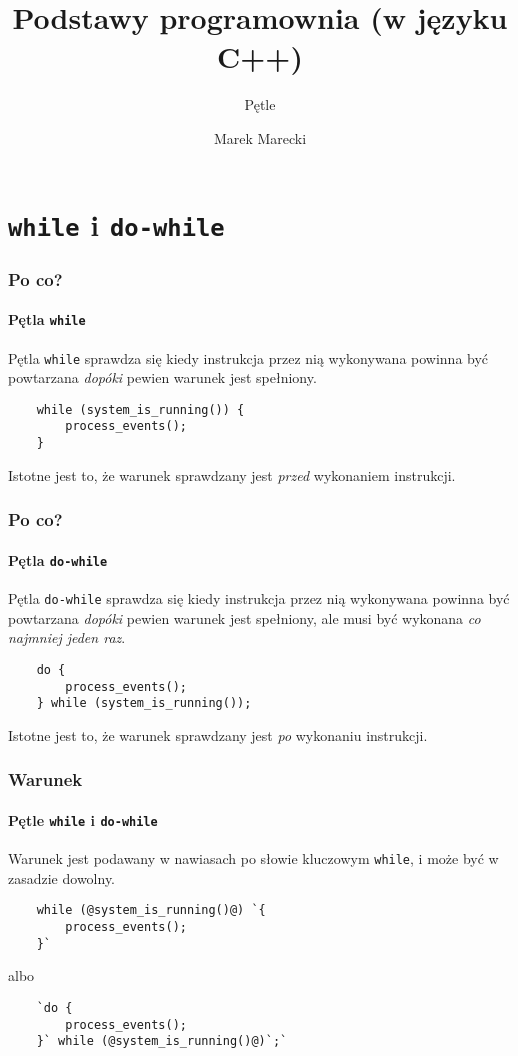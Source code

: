 \documentclass[aspectratio=169]{beamer}
\title{Podstawy programownia (w języku C++)}
\subtitle{Pętle}
\author{Marek Marecki}
\institute{Polsko-Japońska Akademia Technik Komputerowych}
\begin{document}
{%
    \frame{\titlepage}
}

\section{{\tt while} i {\tt do-while}}

\begin{frame}[fragile]
    \frametitle{Po co?}
    \framesubtitle{Pętla {\tt while}}

    Pętla {\tt while} sprawdza się kiedy instrukcja przez nią wykonywana powinna
    być powtarzana \emph{dopóki} pewien warunek jest spełniony.

    \begin{lstlisting}
    while (system_is_running()) {
        process_events();
    }
    \end{lstlisting}

    Istotne jest to, że warunek sprawdzany jest \emph{przed} wykonaniem
    instrukcji.
\end{frame}

\begin{frame}[fragile]
    \frametitle{Po co?}
    \framesubtitle{Pętla {\tt do-while}}

    Pętla {\tt do-while} sprawdza się kiedy instrukcja przez nią wykonywana powinna
    być powtarzana \emph{dopóki} pewien warunek jest spełniony, ale musi być
    wykonana \emph{co najmniej jeden raz}.

    \begin{lstlisting}
    do {
        process_events();
    } while (system_is_running());
    \end{lstlisting}

    Istotne jest to, że warunek sprawdzany jest \emph{po} wykonaniu
    instrukcji.
\end{frame}

\begin{frame}[fragile]
    \frametitle{Warunek}
    \framesubtitle{Pętle {\tt while} i {\tt do-while}}

    Warunek jest podawany w nawiasach po słowie kluczowym {\tt while}, i może
    być w zasadzie dowolny.

    \begin{lstlisting}
    while (@system_is_running()@) `{
        process_events();
    }`
    \end{lstlisting}

    albo

    \begin{lstlisting}
    `do {
        process_events();
    }` while (@system_is_running()@)`;`
    \end{lstlisting}
\end{frame}
\end{document}
